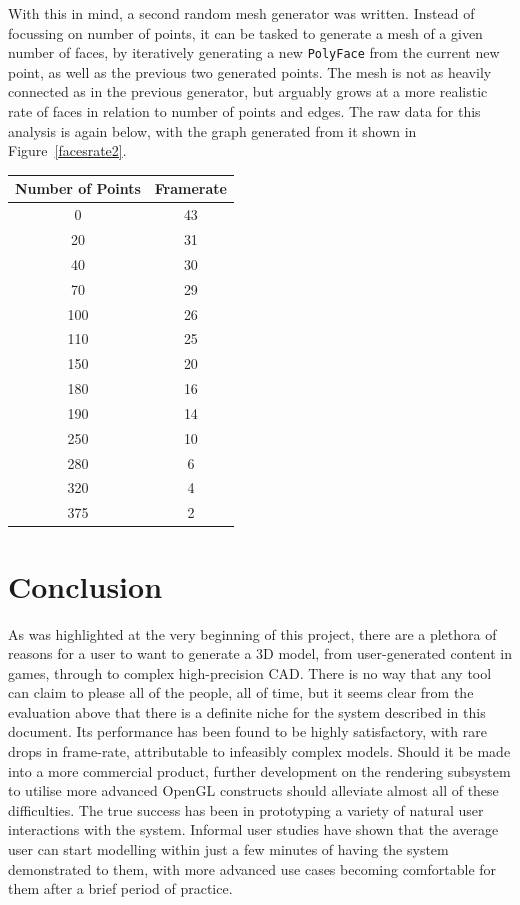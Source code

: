 \documentclass[a4paper,10pt]{article}
\begin{document}
With this in mind, a second random mesh generator was written. Instead of focussing on number of points, it can be tasked to generate a mesh of a given number of faces, by iteratively generating a new \texttt{PolyFace} from the current new point, as well as the previous two generated points. The mesh is not as heavily connected as in the previous generator, but arguably grows at a more realistic rate of faces in relation to number of points and edges. The raw data for this analysis is again below, with the graph generated from it shown in Figure~\ref{facesrate2}.

\begin{center}
\begin{tabular}{| c || c |} 
\hline
\textbf{Number of Points}	& \textbf{Framerate} \\
\hline
\hline
0	& 43 \\
20	& 31 \\
40	& 30 \\
70	& 29 \\
100	& 26 \\
110	& 25 \\
150	& 20 \\
180	& 16 \\
190	& 14 \\
250	& 10 \\
280	& 6 \\
320	& 4 \\
375	& 2 \\
\hline
\end{tabular}
\end{center}

\clearpage

\section{Conclusion}
As was highlighted at the very beginning of this project, there are a plethora of reasons for a user to want to generate a 3D model, from user-generated content in games, through to complex high-precision CAD. There is no way that any tool can claim to please all of the people, all of time, but it seems clear from the evaluation above that there is a definite niche for the system described in this document. Its performance has been found to be highly satisfactory, with rare drops in frame-rate, attributable to infeasibly complex models. Should it be made into a more commercial product, further development on the rendering subsystem to utilise more advanced OpenGL constructs should alleviate almost all of these difficulties. The true success has been in prototyping a variety of natural user interactions with the system. Informal user studies have shown that the average user can start modelling within just a few minutes of having the system demonstrated to them, with more advanced use cases becoming comfortable for them after a brief period of practice.
\end{document}
